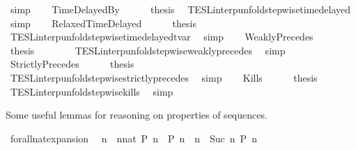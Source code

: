 \begin{isabellebody}
\ simp\isanewline
{}\isamarkupfalse%
\isanewline
\ \ \isamarkupfalse%
\ TimeDelayedBy\isanewline
\ \ \ \ \isamarkupfalse%
\ {\isacharquery}thesis\ \isamarkupfalse%
\ TESL{\isacharunderscore}interp{\isacharunderscore}unfold{\isacharunderscore}stepwise{\isacharunderscore}timedelayed\ \isamarkupfalse%
\ simp\isanewline
{}\isamarkupfalse%
\isanewline
\ \ \isamarkupfalse%
\ RelaxedTimeDelayed\isanewline
\ \ \ \ \isamarkupfalse%
\ {\isacharquery}thesis\ \isamarkupfalse%
\ TESL{\isacharunderscore}interp{\isacharunderscore}unfold{\isacharunderscore}stepwise{\isacharunderscore}timedelayed{\isacharunderscore}tvar\ \isamarkupfalse%
\ simp\isanewline
{}\isamarkupfalse%
\isanewline
\ \ \isamarkupfalse%
\ WeaklyPrecedes\isanewline
\ \ \ \ \isamarkupfalse%
\ {\isacharquery}thesis\isanewline
\ \ \ \ \ \ \isamarkupfalse%
\ TESL{\isacharunderscore}interp{\isacharunderscore}unfold{\isacharunderscore}stepwise{\isacharunderscore}weakly{\isacharunderscore}precedes\ \isamarkupfalse%
\ simp\isanewline
{}\isamarkupfalse%
\isanewline
\ \ \isamarkupfalse%
\ StrictlyPrecedes\isanewline
\ \ \ \ \isamarkupfalse%
\ {\isacharquery}thesis\isanewline
\ \ \ \ \ \ \isamarkupfalse%
\ TESL{\isacharunderscore}interp{\isacharunderscore}unfold{\isacharunderscore}stepwise{\isacharunderscore}strictly{\isacharunderscore}precedes\ \isamarkupfalse%
\ simp\isanewline
{}\isamarkupfalse%
\isanewline
\ \ \isamarkupfalse%
\ Kills\isanewline
\ \ \ \ \isamarkupfalse%
\ {\isacharquery}thesis\isanewline
\ \ \ \ \ \ \isamarkupfalse%
\ TESL{\isacharunderscore}interp{\isacharunderscore}unfold{\isacharunderscore}stepwise{\isacharunderscore}kills\ \isamarkupfalse%
\ simp\isanewline
{}\isamarkupfalse%
%
\endisatagproof
{\isafoldproof}%
%
\isadelimproof
%
\endisadelimproof
%
\begin{isamarkuptext}%
Some useful lemmas for reasoning on properties of sequences.%
\end{isamarkuptext}\isamarkuptrue%
\isamarkupfalse%
\ forall{\isacharunderscore}nat{\isacharunderscore}expansion{\isacharcolon}\isanewline
\ \ {\isacartoucheopen}{\isacharparenleft}{\isasymforall}n\ {\isasymge}\ {\isacharparenleft}nnat{\isacharparenright}{\isachardot}\ P\ n{\isacharparenright}\ {\isacharequal}\ {\isacharparenleft}P\ n\ {\isasymand}\ {\isacharparenleft}{\isasymforall}n\ {\isasymge}\ Suc\ n\ P\ n{\isacharparenright}{\isacharparenright}{\isacartoucheclose}\isanewline

\end{isabellebody}

